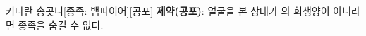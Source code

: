 \documentclass{report}
\begin{document}
	\begin{story}{커다란 송곳니}{[종족: 뱀파이어][공포]}
		\textbf{제약(공포)}: 얼굴을 본 상대가 의 희생양이 아니라면 종족을 숨길 수 없다.
		
		\smallskip
		
	\end{story}
	
\end{document}
